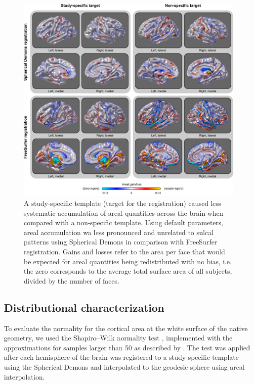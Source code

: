 \begin{figure}[!p]  %
\centering
\includegraphics[width=14cm]{images/registration.png}
\caption[Effect of registration method on areal analyses.]{A study-specific template (target for the registration) caused less systematic accumulation of areal quantities across the brain when compared with a non-specific template. Using default parameters, areal accumulation wa less pronounced and unrelated to sulcal patterns using Spherical Demons in comparison with FreeSurfer registration. Gains and losses refer to the area per face that would be expected for areal quantities being redistributed with no bias, i.e. the zero corresponds to the average total surface area of all subjects, divided by the number of faces.}
\label{fig:registration}
\end{figure}

\subsection{Distributional characterization}

To evaluate the normality for the cortical area at the white surface of the native geometry, we used the Shapiro--Wilk normality test \citep{Shapiro1965}, implemented with the approximations for samples larger than 50 as described by \citet{Royston1993}. The test was applied after each hemisphere of the brain was registered to a study-specific template using the Spherical Demons and interpolated to the geodesic sphere using areal interpolation.

